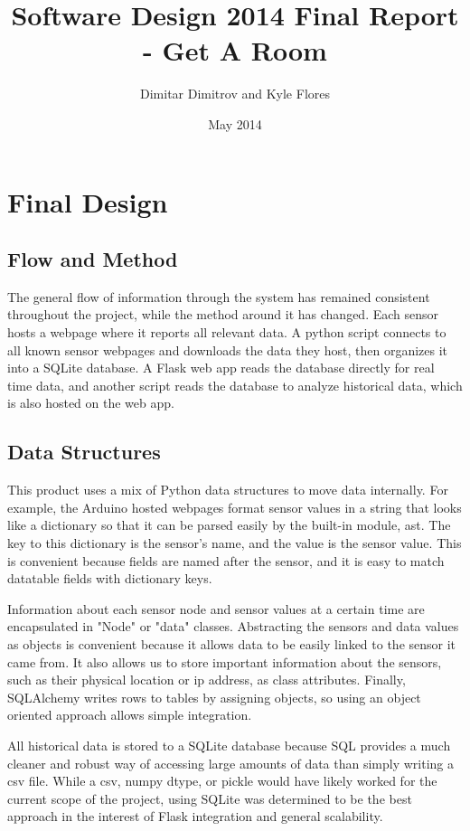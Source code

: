 \documentclass{article}
\title{Software Design 2014 Final Report - Get A Room}
\author{Dimitar Dimitrov and Kyle Flores}
\date{May 2014}
\begin{document}
\maketitle

\section*{Final Design}
\subsection*{Flow and Method}
\par The general flow of information through the system has remained consistent throughout the project, while the method around it has changed. Each sensor hosts a webpage where it reports all relevant data. A python script connects to all known sensor webpages and downloads the data they host, then organizes it into a SQLite database. A Flask web app reads the database directly for real time data, and another script reads the database to analyze historical data, which is also hosted on the web app.

\subsection*{Data Structures}
\par This product uses a mix of Python data structures to move data internally. For example, the Arduino hosted webpages format sensor values in a string that looks like a dictionary so that it can be parsed easily by the built-in module, ast.  The key to this dictionary is the sensor's name, and the value is the sensor value. This is convenient because fields are named after the sensor, and it is easy to match datatable fields with dictionary keys.
\par Information about each sensor node and sensor values at a certain time are encapsulated in "Node" or "data" classes.  Abstracting the sensors and data values as objects is convenient because it allows data to be easily linked to the sensor it came from. It also allows us to store important information about the sensors, such as their physical location or ip address, as class attributes. Finally, SQLAlchemy writes rows to tables by assigning objects, so using an object oriented approach allows simple integration.
\par All historical data is stored to a SQLite database because SQL provides a much cleaner and robust way of accessing large amounts of data than simply writing a csv file.  While a csv, numpy dtype, or pickle would have likely worked for the current scope of the project, using SQLite was determined to be the best approach in the interest of Flask integration and general scalability.
\end{document}
